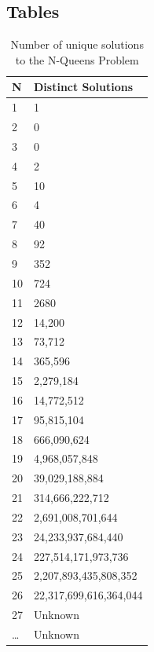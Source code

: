 \documentclass{sig-alternate}
\begin{document}
\subsection{Tables}
\begin{table}[!h]
\centering
\caption{Number of unique solutions to the N-Queens Problem}
\begin{tabular}{|l|l|} \hline
N & Distinct Solutions      \\ \hline
1  & 1                      \\
2  & 0                      \\
3  & 0                      \\
4  & 2                      \\
5  & 10                     \\
6  & 4                      \\
7  & 40                     \\
8  & 92                     \\
9  & 352                    \\
10 & 724                    \\
11 & 2680                   \\
12 & 14,200                 \\
13 & 73,712                 \\
14 & 365,596                \\
15 & 2,279,184              \\
16 & 14,772,512             \\
17 & 95,815,104             \\
18 & 666,090,624            \\
19 & 4,968,057,848          \\
20 & 39,029,188,884         \\
21 & 314,666,222,712        \\
22 & 2,691,008,701,644      \\
23 & 24,233,937,684,440     \\
24 & 227,514,171,973,736    \\
25 & 2,207,893,435,808,352  \\
26 & 22,317,699,616,364,044 \\
27 & Unknown				\\
\dots & Unknown				\\
\hline\end{tabular}
\label{table:numuniquesol}
\end{table}
\end{document}
